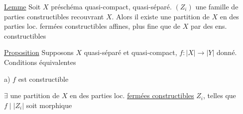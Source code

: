 \uline{Lemme} Soit $X$ préschéma quasi-compact, quasi-séparé.  $(Z_i)$ une famille  de parties constructibles recouvrant $X$. Alors il existe une partition de $X$ en des parties loc. fermées constructibles affines, plus fine que   \uline{} de $X$ par des ens. constructibles

\uline{Proposition} Supposons $X$ quasi-séparé et quasi-compact, $f:|X|\to|Y|$ donné. Conditions équivalentes

a) $f$ est constructible

 $\exists$ une partition  de $X$ en des parties loc. \uline{fermées constructibles}  $Z_i$, telles que $f\mid |Z_i|$ soit morphique

